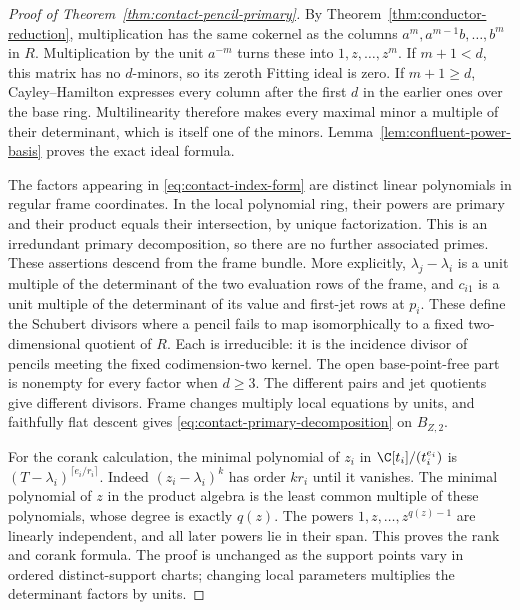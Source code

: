 \begin{proof}[Proof of Theorem~\ref{thm:contact-pencil-primary}]
By Theorem~\ref{thm:conductor-reduction}, multiplication has the
same cokernel as the columns
$a^m,a^{m-1}b,\ldots,b^m$ in $R$. Multiplication by the unit
$a^{-m}$ turns these into $1,z,\ldots,z^m$. If $m+1<d$, this
matrix has no $d$-minors, so its zeroth Fitting ideal is zero.
If $m+1\ge d$, Cayley--Hamilton expresses every column after the
first $d$ in the earlier ones over the base ring. Multilinearity
therefore makes every maximal minor a multiple of their determinant,
which is itself one of the minors. Lemma~\ref{lem:confluent-power-basis}
proves the exact ideal formula.

The factors appearing in \eqref{eq:contact-index-form} are distinct
linear polynomials in regular frame coordinates. In the local
polynomial ring, their powers are primary and their product equals
their intersection, by unique factorization. This is an irredundant
primary decomposition, so there are no further associated primes.
These assertions descend from the frame bundle. More explicitly,
$\lambda_j-\lambda_i$ is a unit multiple of the determinant of
the two evaluation rows of the frame, and $c_{i1}$ is a unit
multiple of the determinant of its value and first-jet rows at
$p_i$. These define the Schubert divisors where a pencil fails to
map isomorphically to a fixed two-dimensional quotient of $R$.
Each is irreducible: it is the incidence divisor of pencils meeting
the fixed codimension-two kernel. The open base-point-free part is
nonempty for every factor when $d\ge3$. The different pairs and
jet quotients give different divisors. Frame changes multiply
local equations by units, and faithfully flat descent gives
\eqref{eq:contact-primary-decomposition} on $B_{Z,2}$.

For the corank calculation, the minimal polynomial of $z_i$ in
$\C[t_i]/(t_i^{e_i})$ is
$(T-\lambda_i)^{\lceil e_i/r_i\rceil}$. Indeed
$(z_i-\lambda_i)^k$ has order $kr_i$ until it vanishes.
The minimal polynomial of $z$ in the product algebra is the least
common multiple of these polynomials, whose degree is exactly
$q(z)$. The powers $1,z,\ldots,z^{q(z)-1}$ are linearly independent,
and all later powers lie in their span. This proves the rank and
corank formula. The proof is unchanged as the support points vary
in ordered distinct-support charts; changing local parameters
multiplies the determinant factors by units.
\end{proof}

